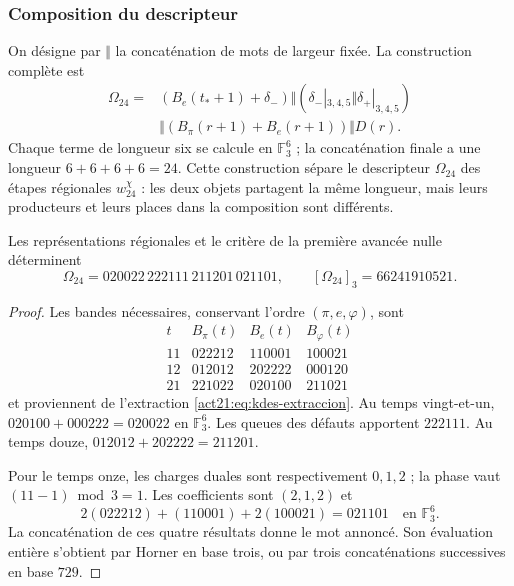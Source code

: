 \subsubsection{Composition du descripteur}

On désigne par $\Vert$ la concaténation de mots de largeur fixée.
La construction complète est
\begin{equation}
 \begin{split}
 \Omega_{24}={}&
 (B_e(t_*+1)+\delta_-)
 \Vert (\delta_-|_{3,4,5}\Vert\delta_+|_{3,4,5})\\
 &\Vert(B_\pi(r+1)+B_e(r+1))\Vert D(r).
 \end{split}
 \label{act21:eq:kdes-omega}
\end{equation}
Chaque terme de longueur six se calcule en $\mathbb F_3^6$ ; la
concaténation finale a une longueur $6+6+6+6=24$. Cette construction
sépare le descripteur $\Omega_{24}$ des étapes régionales
$w_{24}^{\chi}$ : les deux objets partagent la même longueur, mais leurs producteurs
et leurs places dans la composition sont différents.

\begin{proposition}
Les représentations régionales et le critère de la première avancée nulle
déterminent
\[
 \Omega_{24}=020022\,222111\,211201\,021101,
 \qquad [\Omega_{24}]_3=66241910521.
\]
\end{proposition}
\begin{proof}
Les bandes nécessaires, conservant l'ordre $(\pi,e,\varphi)$, sont
\[
 \begin{array}{c|ccc}
 t&B_\pi(t)&B_e(t)&B_\varphi(t)\\\hline
 11&022212&110001&100021\\
 12&012012&202222&000120\\
 21&221022&020100&211021
 \end{array}
\]
et proviennent de l'extraction \eqref{act21:eq:kdes-extraccion}. Au temps
vingt-et-un,
$020100+000222=020022$ en $\mathbb F_3^6$. Les queues des défauts
apportent $222111$. Au temps douze,
$012012+202222=211201$.

Pour le temps onze, les charges duales sont respectivement $0,1,2$ ; la phase vaut $(11-1)\bmod3=1$. Les coefficients sont $(2,1,2)$ et
\[
 2(022212)+(110001)+2(100021)=021101
 \quad\text{en }\mathbb F_3^6.
\]
La concaténation de ces quatre résultats donne le mot annoncé.
Son évaluation entière s'obtient par Horner en base trois, ou par trois
concaténations successives en base $729$.
\end{proof}

